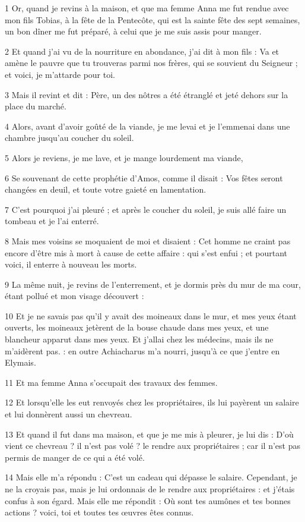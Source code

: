 \par 1 Or, quand je revins à la maison, et que ma femme Anna me fut rendue avec mon fils Tobias, à la fête de la Pentecôte, qui est la sainte fête des sept semaines, un bon dîner me fut préparé, à celui que je me suis assis pour manger.
\par 2 Et quand j'ai vu de la nourriture en abondance, j'ai dit à mon fils : Va et amène le pauvre que tu trouveras parmi nos frères, qui se souvient du Seigneur ; et voici, je m'attarde pour toi.
\par 3 Mais il revint et dit : Père, un des nôtres a été étranglé et jeté dehors sur la place du marché.
\par 4 Alors, avant d'avoir goûté de la viande, je me levai et je l'emmenai dans une chambre jusqu'au coucher du soleil.
\par 5 Alors je reviens, je me lave, et je mange lourdement ma viande,
\par 6 Se souvenant de cette prophétie d'Amos, comme il disait : Vos fêtes seront changées en deuil, et toute votre gaieté en lamentation.
\par 7 C'est pourquoi j'ai pleuré ; et après le coucher du soleil, je suis allé faire un tombeau et je l'ai enterré.
\par 8 Mais mes voisins se moquaient de moi et disaient : Cet homme ne craint pas encore d'être mis à mort à cause de cette affaire : qui s'est enfui ; et pourtant voici, il enterre à nouveau les morts.
\par 9 La même nuit, je revins de l'enterrement, et je dormis près du mur de ma cour, étant pollué et mon visage découvert :
\par 10 Et je ne savais pas qu'il y avait des moineaux dans le mur, et mes yeux étant ouverts, les moineaux jetèrent de la bouse chaude dans mes yeux, et une blancheur apparut dans mes yeux. Et j'allai chez les médecins, mais ils ne m'aidèrent pas. : en outre Achiacharus m'a nourri, jusqu'à ce que j'entre en Elymais.
\par 11 Et ma femme Anna s'occupait des travaux des femmes.
\par 12 Et lorsqu'elle les eut renvoyés chez les propriétaires, ils lui payèrent un salaire et lui donnèrent aussi un chevreau.
\par 13 Et quand il fut dans ma maison, et que je me mis à pleurer, je lui dis : D'où vient ce chevreau ? il n'est pas volé ? le rendre aux propriétaires ; car il n'est pas permis de manger de ce qui a été volé.
\par 14 Mais elle m'a répondu : C'est un cadeau qui dépasse le salaire. Cependant, je ne la croyais pas, mais je lui ordonnais de le rendre aux propriétaires : et j'étais confus à son égard. Mais elle me répondit : Où sont tes aumônes et tes bonnes actions ? voici, toi et toutes tes œuvres êtes connus.

